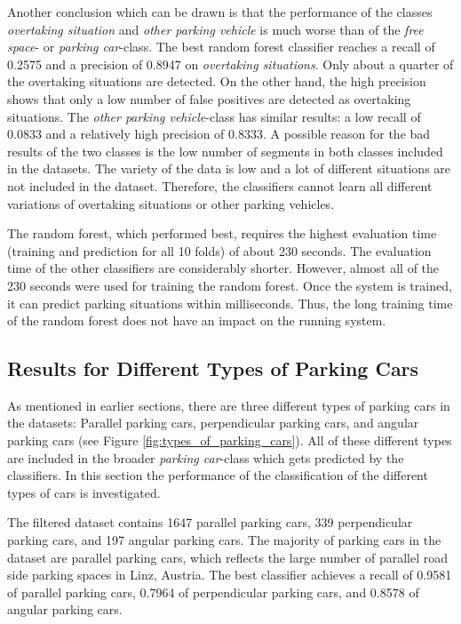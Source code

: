 Another conclusion which can be drawn is that the performance of the classes \emph{overtaking situation} and \emph{other parking vehicle} is much worse than of the \emph{free space}- or \emph{parking car}-class. The best random forest classifier reaches a recall of 0.2575 and a precision of 0.8947 on \emph{overtaking situations}. Only about a quarter of the overtaking situations are detected. 
On the other hand, the high precision shows that only a low number of false positives are detected as overtaking situations. 
The \emph{other parking vehicle}-class has similar results: a low recall of 0.0833 and a relatively high precision of 0.8333.
A possible reason for the bad results of the two classes is the low number of segments in both classes included in the datasets. The variety of the data is low and a lot of different situations are not included in the dataset. Therefore, the classifiers cannot learn all different variations of overtaking situations or other parking vehicles.

The random forest, which performed best, requires the highest evaluation time (training and prediction for all 10 folds) of about 230 seconds. The evaluation time of the other classifiers are considerably shorter. However, almost all of the 230 seconds were used for training the random forest. Once the system is trained, it can predict parking situations within milliseconds. Thus, the long training time of the random forest does not have an impact on the running system.





\subsection{Results for Different Types of Parking Cars}

As mentioned in earlier sections, there are three different types of parking cars in the datasets: Parallel parking cars, perpendicular parking cars, and angular parking cars (see Figure \ref{fig:types_of_parking_cars}). All of these different types are included in the broader \emph{parking car}-class which gets predicted by the classifiers. In this section the performance of the classification of the different types of cars is investigated.

The filtered dataset contains 1647 parallel parking cars, 339 perpendicular parking cars, and 197 angular parking cars. The majority of parking cars in the dataset are parallel parking cars, which reflects the large number of parallel road side parking spaces in Linz, Austria. The best classifier achieves a recall of 0.9581 of parallel parking cars, 0.7964 of perpendicular parking cars, and 0.8578 of angular parking cars.


